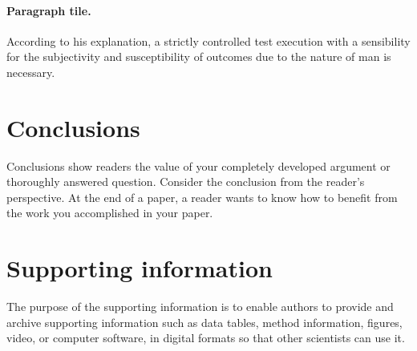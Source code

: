 \documentclass[11pt, a4paper]{article}
\begin{document}
\paragraph{Paragraph tile.}
According to his explanation, a strictly controlled test execution with a sensibility for the subjectivity and susceptibility of outcomes due to the nature of man is necessary.

\section{Conclusions}\label{sec:conc} 
Conclusions show readers the value of your completely developed argument or thoroughly answered question. Consider the conclusion from the reader's perspective. At the end of a paper, a reader wants to know how to benefit from the work you accomplished in your paper. 

\appendix
\section{Supporting information}
The purpose of the supporting information is to enable authors to provide and archive supporting information such as data tables, method information, figures, video, or computer software, in digital formats so that other scientists can use it.

\small \singlespacing
 

\end{document}
